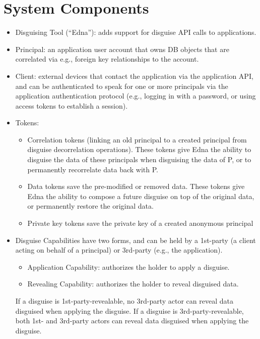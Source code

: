 \section{System Components}
\begin{itemize}
\item Disguising Tool (``Edna''): adds support for disguise API calls to applications.
\item Principal: an application user account that owns DB objects that are correlated via e.g., foreign key relationships to the account.
\item Client: external devices that contact the application via the application API, and can be authenticated to speak for one or more principals via the application authentication protocol (e.g., logging in with a password, or using access tokens to establish a session).
\item Tokens: 
\begin{itemize}
    \item Correlation tokens (linking an old principal to a created principal from disguise decorrelation operations). These tokens give Edna the ability to disguise the data of these principals when disguising the data of P, or to permanently recorrelate data back with P.
    \item Data tokens save the pre-modified or removed data. These tokens give Edna the ability to compose a future disguise on top of the original data, or permanently restore the original data.
    \item Private key tokens save the private key of a created anonymous principal
\end{itemize}
\item Disguise Capabilities have two forms, and can be held by a 1st-party (a client acting on
behalf of a principal) or 3rd-party (e.g., the application).
\begin{itemize}
\item Application Capability: authorizes the holder to apply a disguise.
\item Revealing Capability: authorizes the holder to reveal disguised data.
\end{itemize}
If a disguise is 1st-party-revealable, no 3rd-party actor can reveal data disguised when applying the
disguise.
If a disguise is 3rd-party-revealable, both 1st- and 3rd-party actors can reveal data disguised when applying the
disguise.
\end{itemize}

